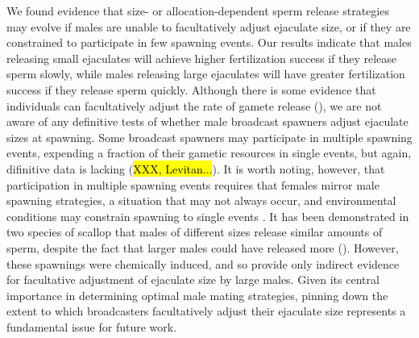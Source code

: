 \documentclass{article}
\begin{document}
We found evidence that size- or allocation-dependent sperm release strategies may evolve if males are unable to facultatively adjust ejaculate size, or if they are constrained to participate in few spawning events. Our results indicate that males releasing small ejaculates will achieve higher fertilization success if they release sperm slowly, while males releasing large ejaculates will have greater fertilization success if they release sperm quickly. Although there is some evidence that individuals can facultatively adjust the rate of gamete release (\citealt{Marshall2004}), we are not aware of any definitive tests of whether male broadcast spawners adjust ejaculate sizes at spawning. Some broadcast spawners may participate in multiple spawning events, expending a fraction of their gametic resources in single events, but again, difinitive data is lacking (\hl{XXX, Levitan...}). It is worth noting, however, that participation in multiple spawning events requires that females mirror male spawning strategies, a situation that may not always occur, and environmental conditions may constrain spawning to single events \citep{Olito2015,Olito2017}. It has been demonstrated in two species of scallop that males of different sizes release similar amounts of sperm, despite the fact that larger males could have released more (\citealt{Styan2003}). However, these spawnings were chemically induced, and so provide only indirect evidence for facultative adjustment of ejaculate size by large males. Given its central importance in determining optimal male mating strategies, pinning down the extent to which broadcasters facultatively adjust their ejaculate size represents a fundamental issue for future work.  
\end{document}
